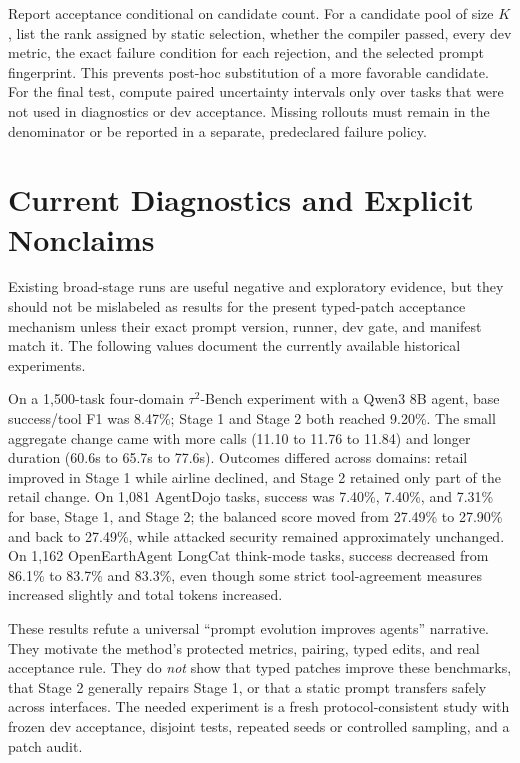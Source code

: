 \documentclass[10pt]{article}
\begin{document}
Report acceptance conditional on candidate count. For a candidate pool of size $K$, list the rank assigned by static selection, whether the compiler passed, every dev metric, the exact failure condition for each rejection, and the selected prompt fingerprint. This prevents post-hoc substitution of a more favorable candidate. For the final test, compute paired uncertainty intervals only over tasks that were not used in diagnostics or dev acceptance. Missing rollouts must remain in the denominator or be reported in a separate, predeclared failure policy.

\section{Current Diagnostics and Explicit Nonclaims}
\label{sec:diagnostics}
Existing broad-stage runs are useful negative and exploratory evidence, but they should not be mislabeled as results for the present typed-patch acceptance mechanism unless their exact prompt version, runner, dev gate, and manifest match it. The following values document the currently available historical experiments.

On a 1,500-task four-domain $\tau^2$-Bench experiment with a Qwen3 8B agent, base success/tool F1 was 8.47\%; Stage 1 and Stage 2 both reached 9.20\%. The small aggregate change came with more calls (11.10 to 11.76 to 11.84) and longer duration (60.6s to 65.7s to 77.6s). Outcomes differed across domains: retail improved in Stage 1 while airline declined, and Stage 2 retained only part of the retail change. On 1,081 AgentDojo tasks, success was 7.40\%, 7.40\%, and 7.31\% for base, Stage 1, and Stage 2; the balanced score moved from 27.49\% to 27.90\% and back to 27.49\%, while attacked security remained approximately unchanged. On 1,162 OpenEarthAgent LongCat think-mode tasks, success decreased from 86.1\% to 83.7\% and 83.3\%, even though some strict tool-agreement measures increased slightly and total tokens increased.

These results refute a universal ``prompt evolution improves agents'' narrative. They motivate the method's protected metrics, pairing, typed edits, and real acceptance rule. They do \emph{not} show that typed patches improve these benchmarks, that Stage 2 generally repairs Stage 1, or that a static prompt transfers safely across interfaces. The needed experiment is a fresh protocol-consistent study with frozen dev acceptance, disjoint tests, repeated seeds or controlled sampling, and a patch audit.
\end{document}

